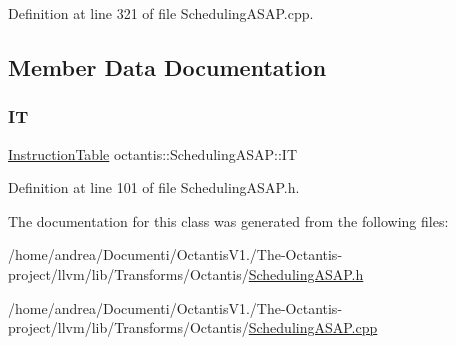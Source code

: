 Definition at line 321 of file Scheduling\+A\+S\+A\+P.\+cpp.



\subsection{Member Data Documentation}
\mbox{\label{classoctantis_1_1SchedulingASAP_ac53b361e1b4663c158238d93b931dce3}} 
\subsubsection{\texorpdfstring{IT}{IT}}
{\footnotesize\ttfamily \hyperlink{classoctantis_1_1InstructionTable}{Instruction\+Table} octantis\+::\+Scheduling\+A\+S\+A\+P\+::\+IT}



Definition at line 101 of file Scheduling\+A\+S\+A\+P.\+h.



The documentation for this class was generated from the following files\+:\begin{DoxyCompactItemize}
\item 
/home/andrea/\+Documenti/\+Octantis\+V1./\+The-\/\+Octantis-\/project/llvm/lib/\+Transforms/\+Octantis/\hyperlink{SchedulingASAP_8h}{Scheduling\+A\+S\+A\+P.\+h}\item 
/home/andrea/\+Documenti/\+Octantis\+V1./\+The-\/\+Octantis-\/project/llvm/lib/\+Transforms/\+Octantis/\hyperlink{SchedulingASAP_8cpp}{Scheduling\+A\+S\+A\+P.\+cpp}\end{DoxyCompactItemize}
